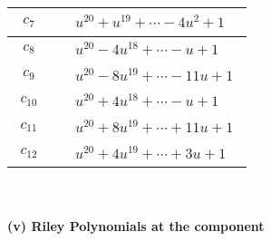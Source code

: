 \documentclass[1p]{elsarticle_modified}
\theoremstyle{definition}
\begin{document}
\begin{tabular}{m{50pt}|m{274pt}}
\hline $$\begin{aligned}c_{7}\end{aligned}$$&$\begin{aligned}
&u^{20}+u^{19}+\cdots-4 u^2+1
\end{aligned}$\\
\hline $$\begin{aligned}c_{8}\end{aligned}$$&$\begin{aligned}
&u^{20}-4 u^{18}+\cdots- u+1
\end{aligned}$\\
\hline $$\begin{aligned}c_{9}\end{aligned}$$&$\begin{aligned}
&u^{20}-8 u^{19}+\cdots-11 u+1
\end{aligned}$\\
\hline $$\begin{aligned}c_{10}\end{aligned}$$&$\begin{aligned}
&u^{20}+4 u^{18}+\cdots- u+1
\end{aligned}$\\
\hline $$\begin{aligned}c_{11}\end{aligned}$$&$\begin{aligned}
&u^{20}+8 u^{19}+\cdots+11 u+1
\end{aligned}$\\
\hline $$\begin{aligned}c_{12}\end{aligned}$$&$\begin{aligned}
&u^{20}+4 u^{19}+\cdots+3 u+1
\end{aligned}$\\
\hline
\end{tabular}\\~\\
\newpage\renewcommand{\arraystretch}{1}
\flushleft \textbf{(v) Riley Polynomials at the component}\newline \\
\end{document}
